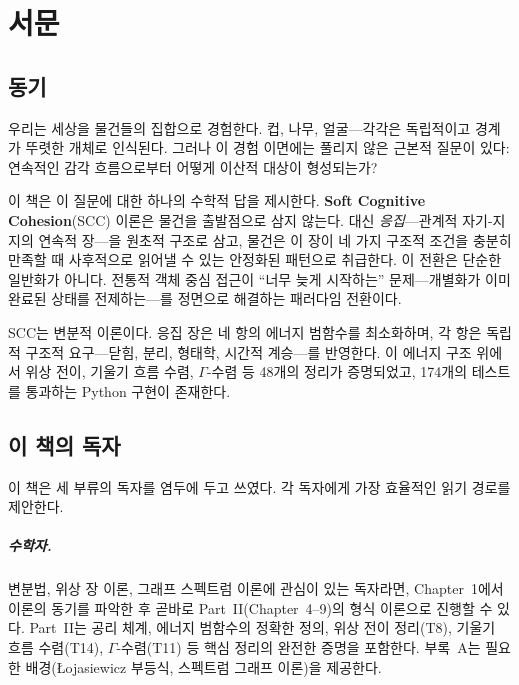 
\chapter*{서문}

\section*{동기}

우리는 세상을 물건들의 집합으로 경험한다. 컵, 나무, 얼굴---각각은 독립적이고 경계가 뚜렷한 개체로 인식된다. 그러나 이 경험 이면에는 풀리지 않은 근본적 질문이 있다: 연속적인 감각 흐름으로부터 어떻게 이산적 대상이 형성되는가?

이 책은 이 질문에 대한 하나의 수학적 답을 제시한다. \textbf{Soft Cognitive Cohesion}(SCC) 이론은 물건을 출발점으로 삼지 않는다. 대신 \emph{응집}---관계적 자기-지지의 연속적 장---을 원초적 구조로 삼고, 물건은 이 장이 네 가지 구조적 조건을 충분히 만족할 때 사후적으로 읽어낼 수 있는 안정화된 패턴으로 취급한다. 이 전환은 단순한 일반화가 아니다. 전통적 객체 중심 접근이 ``너무 늦게 시작하는'' 문제---개별화가 이미 완료된 상태를 전제하는---를 정면으로 해결하는 패러다임 전환이다.

SCC는 변분적 이론이다. 응집 장은 네 항의 에너지 범함수를 최소화하며, 각 항은 독립적 구조적 요구---닫힘, 분리, 형태학, 시간적 계승---를 반영한다. 이 에너지 구조 위에서 위상 전이, 기울기 흐름 수렴, $\Gamma$-수렴 등 48개의 정리가 증명되었고, 174개의 테스트를 통과하는 Python 구현이 존재한다.


\section*{이 책의 독자}

이 책은 세 부류의 독자를 염두에 두고 쓰였다. 각 독자에게 가장 효율적인 읽기 경로를 제안한다.

\paragraph{수학자.}
변분법, 위상 장 이론, 그래프 스펙트럼 이론에 관심이 있는 독자라면, Chapter~1에서 이론의 동기를 파악한 후 곧바로 Part~II(Chapter~4--9)의 형식 이론으로 진행할 수 있다. Part~II는 공리 체계, 에너지 범함수의 정확한 정의, 위상 전이 정리(T8), 기울기 흐름 수렴(T14), $\Gamma$-수렴(T11) 등 핵심 정리의 완전한 증명을 포함한다. 부록~A는 필요한 배경(Łojasiewicz 부등식, 스펙트럼 그래프 이론)을 제공한다.

